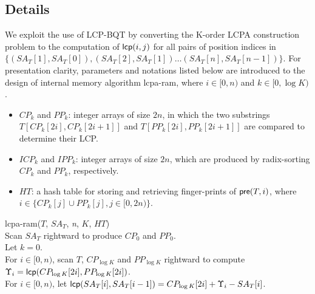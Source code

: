 \documentclass[article]{IEEEtran}
\theoremstyle{definition}
\theoremstyle{remark}
\numberwithin{equation}{section}
\begin{document}
\subsection{Details}\label{subsec:implementation_in_ram}

We exploit the use of LCP-BQT by converting the K-order LCPA construction problem to the computation of ${\sf lcp}(i,j)$ for all pairs of position indices in $\{(SA_T[1], SA_T[0]),(SA_T[2], SA_T[1])\ldots (SA_T[n], SA_T[n-1])\}$. For presentation clarity, parameters and notations listed below are introduced to the design of internal memory algorithm lcpa-ram, where $i\in [0,n)$ and $k\in [0,\log K)$.

\begin{itemize}
\item $CP_k$ and $PP_k$: integer arrays of size $2n$, in which the two substrings $T[CP_k[2i],CP_k[2i+1]]$ and $T[PP_k[2i],PP_k[2i+1]]$ are compared to determine their LCP.
\item $ICP_k$ and $IPP_k$: integer arrays of size $2n$, which are produced by radix-sorting $CP_k$ and $PP_k$, respectively.
\item $HT$: a hash table for storing and retrieving finger-prints of ${\sf pre}(T,i)$, where $i\in \{CP_k[j] \cup PP_k[j], j\in[0,2n)\}$.
\end{itemize}




\begin{algorithm}[hbtp!]
\caption{Compute $K$-Order $LCPA_T$ in RAM}
\label{fig:alg:ram}
lcpa-ram($T$, $SA_T$, {\em n}, $K$, $HT$){\\
\SetAlgoNoLine
Scan $SA_T$ rightward to produce $CP_0$ and $PP_0$. \\
Let $k = 0$. \\
\While{$k < \log K$}{
\Indentp{-1em}
Radix-sort $CP_k$ and $PP_k$ to produce $ICP_k$ and $IPP_k$. \\
For $i\in [0,n)$, scan $T$ rightward to compute the finger-print of ${\sf pre}(T,i)$ and let $FP[0,i]=HT[i]$ if $i\in \{ICP_k[j] \cup IPP_k[j], j\in[0,2n)\}$. \\
For $i\in [0,n)$, scan $CP_k$ and $PP_k$ rightward to compute and compare $FP[CP_k[2i]+1,CP_k[2i+1]]$ and $FP[PP_k[2i]+1,PP_k[2i+1]]$ for generating $CP_{k+1}$ and $PP_{k+1}$. \\
Let $k = k +1$ and clear $HT$. \\
}
For $i\in [0,n)$, scan $T$, $CP_{\log K}$ and $PP_{\log K}$ rightward to compute $\Upsilon_i = {\sf lcp}(CP_{\log K}[2i],PP_{\log K}[2i])$. \\
For $i\in [0,n)$, let ${\sf lcp}(SA_T[i],SA_T[i-1])=CP_{\log K}[2i] +\Upsilon_i-SA_T[i]$. \\
}
\end{algorithm}
\end{document}
